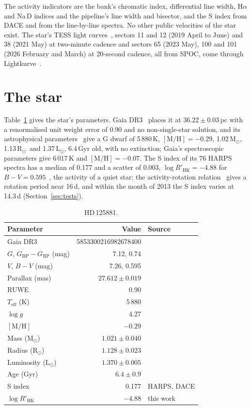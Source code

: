 \documentclass[3p,11pt]{elsarticle}
\newcommand{\Msun}{M$_\odot$}
\newcommand{\Rsun}{R$_\odot$}
\newcommand{\Lsun}{L$_\odot$}
\begin{document}
The activity indicators are the bank's chromatic index, differential line width, H$\alpha$ and Na\,D
indices and the pipeline's line width and bisector, and the S index from DACE and from the
line-by-line spectra. No other public velocities of the star exist. The star's TESS light
curves~\cite{Ricker2015}, sectors 11 and 12 (2019 April to June) and 38 (2021 May) at two-minute
cadence and sectors 65 (2023 May), 100 and 101 (2026 February and March) at 20-second cadence, all from
SPOC, come through Lightkurve~\cite{Lightkurve2018}.

\section{The star}\label{sec:star}

Table~\ref{tab:star} gives the star's parameters. Gaia DR3~\cite{GaiaDR3} places it at
$36.22 \pm 0.03$\,pc with a renormalised unit weight error of 0.90 and no non-single-star solution, and
its astrophysical parameters~\cite{Creevey2023} give a G dwarf of 5\,880\,K, $[\mathrm{M/H}] = -0.29$,
1.02\,\Msun, 1.13\,\Rsun\ and 1.37\,\Lsun, 6.4\,Gyr old, with no extinction; Gaia's spectroscopic
parameters give 6\,017\,K and $[\mathrm{M/H}] = -0.07$. The S index of its 76 HARPS spectra has a median
of 0.177 and a scatter of 0.003, $\log R'_\mathrm{HK} = -4.88$ for $B-V = 0.595$~\cite{Noyes1984}, the
activity of a quiet star; the activity-rotation relation~\cite{Mamajek2008} gives a rotation period
near 16\,d, and within the month of 2013 the S index varies at 14.3\,d (Section~\ref{sec:tests}).

\begin{table}[!htbp]
\centering
\caption{HD\,125881.}\label{tab:star}
\begin{tabular}{l r l}
\toprule
Parameter & Value & Source \\
\midrule
Gaia DR3 & 5853300216982678400 & \cite{GaiaDR3} \\
$G$, $G_\mathrm{BP} - G_\mathrm{RP}$ (mag) & 7.12, 0.74 & \cite{GaiaDR3} \\
$V$, $B-V$ (mag) & 7.26, 0.595 & \cite{Perryman1997} \\
Parallax (mas) & $27.612 \pm 0.019$ & \cite{GaiaDR3} \\
RUWE & 0.90 & \cite{GaiaDR3} \\
$T_\mathrm{eff}$ (K) & 5\,880 & \cite{Creevey2023} \\
$\log g$ & 4.27 & \cite{Creevey2023} \\
$[\mathrm{M/H}]$ & $-0.29$ & \cite{Creevey2023} \\
Mass (\Msun) & $1.021 \pm 0.040$ & \cite{Creevey2023} \\
Radius (\Rsun) & $1.128 \pm 0.023$ & \cite{Creevey2023} \\
Luminosity (\Lsun) & $1.370 \pm 0.005$ & \cite{Creevey2023} \\
Age (Gyr) & $6.4 \pm 0.9$ & \cite{Creevey2023} \\
S index & 0.177 & HARPS, DACE \\
$\log R'_\mathrm{HK}$ & $-4.88$ & this work \\
\bottomrule
\end{tabular}
\end{table}
\end{document}
